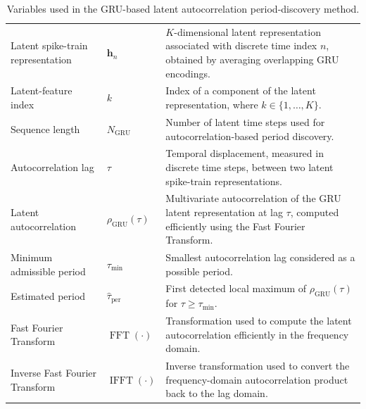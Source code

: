 \documentclass[a4paper]{article}
\begin{document}
\begin{table}[H]
\begin{tabular}{p{} p{} p{}}
         Latent spike-train representation
         & $\mathbf{h}_n$
         & $K$-dimensional latent representation associated with discrete time index $n$, obtained by averaging overlapping GRU encodings. \\

         Latent-feature index
         & $k$
         & Index of a component of the latent representation, where $k \in \{1,\ldots,K\}$. \\

         Sequence length
         & $N_{\mathrm{GRU}}$
         & Number of latent time steps used for autocorrelation-based period discovery. \\

         Autocorrelation lag
         & $\tau$
         & Temporal displacement, measured in discrete time steps, between two latent spike-train representations. \\

         Latent autocorrelation
         & $\rho_{\mathrm{GRU}}(\tau)$
         & Multivariate autocorrelation of the GRU latent representation at lag $\tau$, computed efficiently using the Fast Fourier Transform. \\

         Minimum admissible period
         & $\tau_{\min}$
         & Smallest autocorrelation lag considered as a possible period. \\

         Estimated period
         & $\hat{\tau}_{\mathrm{per}}$
         & First detected local maximum of $\rho_{\mathrm{GRU}}(\tau)$ for $\tau \geq \tau_{\min}$. \\

         Fast Fourier Transform
         & $\operatorname{FFT}(\cdot)$
         & Transformation used to compute the latent autocorrelation efficiently in the frequency domain. \\

         Inverse Fast Fourier Transform
         & $\operatorname{IFFT}(\cdot)$
         & Inverse transformation used to convert the frequency-domain autocorrelation product back to the lag domain. \\

         \hline

      \end{tabular}

      \caption{Variables used in the GRU-based latent autocorrelation period-discovery method.}

      \label{tab:gru-fft-period-discovery-variables}

   \end{table}

   
   
\end{document}
